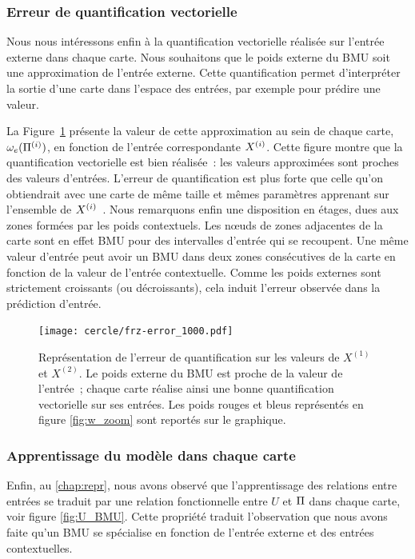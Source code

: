\documentclass[../main]{subfiles}
\begin{document}
\subsubsection{Erreur de quantification vectorielle}

Nous nous intéressons enfin à la quantification vectorielle réalisée sur l'entrée externe dans chaque carte. Nous souhaitons que le poids externe du BMU soit une approximation de l'entrée externe. Cette quantification permet d'interpréter la sortie d'une carte dans l'espace des entrées, par exemple pour prédire une valeur.

La Figure~\ref{fig:qv} présente la valeur de cette approximation au sein de chaque carte, $\omega_{e}(\Pi^{({i})})$, en fonction de l'entrée correspondante $X^{({i})}$. 
Cette figure montre que la quantification vectorielle est bien réalisée~: les valeurs approximées sont proches des valeurs d'entrées.
L'erreur de quantification est plus forte que celle qu'on obtiendrait avec une carte de même taille et mêmes paramètres apprenant sur l'ensemble de $X^{({i})}$~. 
Nous remarquons enfin une disposition en étages, dues aux zones formées par les poids contextuels.
Les n\oe{}uds de zones adjacentes de la carte sont en effet BMU pour des intervalles d'entrée qui se recoupent.
Une même valeur d'entrée peut avoir un BMU dans deux zones consécutives de la carte en fonction de la valeur de l'entrée contextuelle. Comme les poids externes sont strictement croissants (ou décroissants), cela induit l'erreur observée dans la prédiction d'entrée.

\begin{figure}
	\centering\texttt{[image: cercle/frz-error\_1000.pdf]}
	\caption{Représentation de l'erreur de quantification sur les valeurs de $X^{(1)}$ et $X^{(2)}$. Le poids externe du BMU est proche de la valeur de l'entrée~; chaque carte réalise ainsi une bonne quantification vectorielle sur ses entrées. 
	Les poids rouges et bleus représentés en figure \ref{fig:w_zoom} sont reportés sur le graphique. \label{fig:qv}}
\end{figure}

\subsubsection{Apprentissage du modèle dans chaque carte}

Enfin, au \ref{chap:repr}, nous avons observé que l'apprentissage des relations entre entrées se traduit par une relation fonctionnelle entre $U$ et $\Pi$ dans chaque carte, voir figure \ref{fig:U_BMU}.
Cette propriété traduit l'observation que nous avons faite qu'un BMU se spécialise en fonction de l'entrée externe et des entrées contextuelles.
\end{document}
